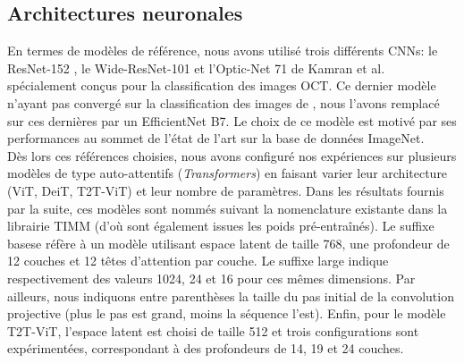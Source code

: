 \subsection{Architectures neuronales}
En termes de modèles de référence, nous avons utilisé trois différents \ac{CNN}s: le ResNet-152 \cite{heDeepResidualLearning2016a}, le Wide-ResNet-101 \cite{zagoruykoWideResidualNetworks2016} et l'Optic-Net 71 \cite{kamranOpticNetNovelConvolutional2019} de Kamran et al. spécialement conçus pour la classification des images OCT. Ce dernier modèle n'ayant pas convergé sur la classification des images de \fundus{}, nous l'avons remplacé sur ces dernières par un EfficientNet B7. Le choix de ce modèle est motivé par ses performances au sommet de l'état de l'art sur la base de données ImageNet. \\
Dès lors ces références choisies, nous avons configuré nos expériences sur plusieurs modèles de type auto-attentifs (\textit{Transformers}) en faisant varier leur architecture (ViT, DeiT, T2T-ViT) et leur nombre de paramètres. Dans les résultats fournis par la suite, ces modèles sont nommés suivant la nomenclature existante dans la librairie TIMM \cite{wightmanPyTorchImageModelsWightman} (d'où sont également issues les poids pré-entraînés). Le suffixe \og base\fg se réfère à un modèle utilisant espace latent de taille 768, une profondeur de 12 couches et 12 têtes d'attention par couche. Le suffixe \og large \fg indique respectivement des valeurs 1024, 24 et 16 pour ces mêmes dimensions. Par ailleurs, nous indiquons entre parenthèses la taille du pas initial de la convolution projective (plus le pas est grand, moins la séquence l'est). Enfin, pour le modèle T2T-ViT, l'espace latent est choisi de taille 512 et trois configurations sont expérimentées, correspondant à des profondeurs de 14, 19 et 24 couches.

